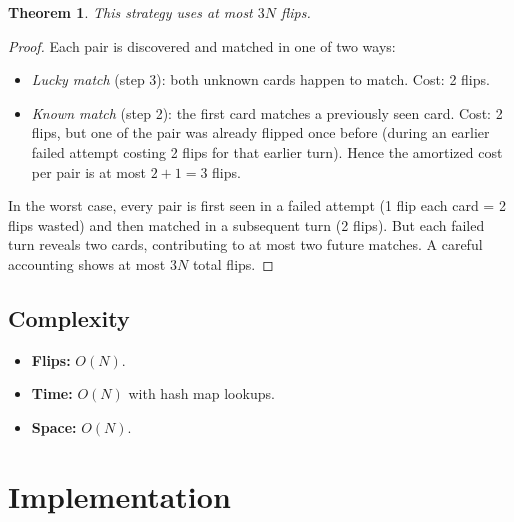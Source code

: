 \documentclass[11pt,a4paper]{article}
\newtheorem{theorem}{Theorem}
\begin{document}
\begin{theorem}
This strategy uses at most $3N$ flips.
\end{theorem}
\begin{proof}
Each pair is discovered and matched in one of two ways:
\begin{itemize}
    \item \emph{Lucky match} (step 3): both unknown cards happen to match. Cost: 2 flips.
    \item \emph{Known match} (step 2): the first card matches a previously seen card. Cost: 2 flips, but one of the pair was already flipped once before (during an earlier failed attempt costing 2 flips for that earlier turn). Hence the amortized cost per pair is at most $2 + 1 = 3$ flips.
\end{itemize}
In the worst case, every pair is first seen in a failed attempt (1 flip each card = 2 flips wasted) and then matched in a subsequent turn (2 flips). But each failed turn reveals two cards, contributing to at most two future matches. A careful accounting shows at most $3N$ total flips.
\end{proof}

\subsection{Complexity}
\begin{itemize}
    \item \textbf{Flips:} $O(N)$.
    \item \textbf{Time:} $O(N)$ with hash map lookups.
    \item \textbf{Space:} $O(N)$.
\end{itemize}

\section{Implementation}
\end{document}
